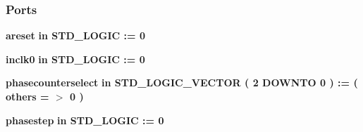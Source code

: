 \subsubsection*{Ports}
 \begin{DoxyCompactItemize}
\item 
{\bf areset}  {\bfseries {\bfseries \textcolor{keywordflow}{in}\textcolor{vhdlchar}{ }}} {\bfseries \textcolor{comment}{S\+T\+D\+\_\+\+L\+O\+G\+IC}\textcolor{vhdlchar}{ }\textcolor{vhdlchar}{ }\textcolor{vhdlchar}{\+:}\textcolor{vhdlchar}{=}\textcolor{vhdlchar}{ }\textcolor{vhdlchar}{ }\textcolor{vhdlchar}{\textquotesingle{}}\textcolor{vhdlchar}{ } \textcolor{vhdldigit}{0} \textcolor{vhdlchar}{ }\textcolor{vhdlchar}{\textquotesingle{}}\textcolor{vhdlchar}{ }} 
\item 
{\bf inclk0}  {\bfseries {\bfseries \textcolor{keywordflow}{in}\textcolor{vhdlchar}{ }}} {\bfseries \textcolor{comment}{S\+T\+D\+\_\+\+L\+O\+G\+IC}\textcolor{vhdlchar}{ }\textcolor{vhdlchar}{ }\textcolor{vhdlchar}{\+:}\textcolor{vhdlchar}{=}\textcolor{vhdlchar}{ }\textcolor{vhdlchar}{ }\textcolor{vhdlchar}{\textquotesingle{}}\textcolor{vhdlchar}{ } \textcolor{vhdldigit}{0} \textcolor{vhdlchar}{ }\textcolor{vhdlchar}{\textquotesingle{}}\textcolor{vhdlchar}{ }} 
\item 
{\bf phasecounterselect}  {\bfseries {\bfseries \textcolor{keywordflow}{in}\textcolor{vhdlchar}{ }}} {\bfseries \textcolor{comment}{S\+T\+D\+\_\+\+L\+O\+G\+I\+C\+\_\+\+V\+E\+C\+T\+OR}\textcolor{vhdlchar}{ }\textcolor{vhdlchar}{(}\textcolor{vhdlchar}{ }\textcolor{vhdlchar}{ } \textcolor{vhdldigit}{2} \textcolor{vhdlchar}{ }\textcolor{keywordflow}{D\+O\+W\+N\+TO}\textcolor{vhdlchar}{ }\textcolor{vhdlchar}{ } \textcolor{vhdldigit}{0} \textcolor{vhdlchar}{ }\textcolor{vhdlchar}{)}\textcolor{vhdlchar}{ }\textcolor{vhdlchar}{ }\textcolor{vhdlchar}{ }\textcolor{vhdlchar}{\+:}\textcolor{vhdlchar}{=}\textcolor{vhdlchar}{ }\textcolor{vhdlchar}{(}\textcolor{vhdlchar}{ }\textcolor{vhdlchar}{ }\textcolor{keywordflow}{others}\textcolor{vhdlchar}{ }\textcolor{vhdlchar}{ }\textcolor{vhdlchar}{=}\textcolor{vhdlchar}{ }\textcolor{vhdlchar}{$>$}\textcolor{vhdlchar}{ }\textcolor{vhdlchar}{\textquotesingle{}}\textcolor{vhdlchar}{ } \textcolor{vhdldigit}{0} \textcolor{vhdlchar}{ }\textcolor{vhdlchar}{\textquotesingle{}}\textcolor{vhdlchar}{ }\textcolor{vhdlchar}{)}\textcolor{vhdlchar}{ }} 
\item 
{\bf phasestep}  {\bfseries {\bfseries \textcolor{keywordflow}{in}\textcolor{vhdlchar}{ }}} {\bfseries \textcolor{comment}{S\+T\+D\+\_\+\+L\+O\+G\+IC}\textcolor{vhdlchar}{ }\textcolor{vhdlchar}{ }\textcolor{vhdlchar}{\+:}\textcolor{vhdlchar}{=}\textcolor{vhdlchar}{ }\textcolor{vhdlchar}{ }\textcolor{vhdlchar}{\textquotesingle{}}\textcolor{vhdlchar}{ } \textcolor{vhdldigit}{0} \textcolor{vhdlchar}{ }\textcolor{vhdlchar}{\textquotesingle{}}\textcolor{vhdlchar}{ }} 

\end{DoxyCompactItemize}
